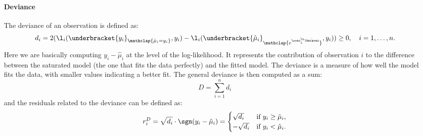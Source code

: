 \paragraph{Deviance}

The deviance of an observation is defined as:
\begin{equation}
    d_i = 2(\l_i(\underbracket{y_i}_{\mathclap{\hat{\mu}_i = y_i}}, y_i) - \l_i(\underbracket{\hat{\mu}_i}_{\mathclap{e^{\xvec_i^\t\hat{\betavec}}}}, y_i)) \geq 0, \quad i = 1, \ldots, n.
\end{equation}
Here we are basically computing $y_i - \hat{\mu}_i$ at the level of the log-likelihood. It represents the contribution of observation $i$ to the difference between the saturated model (the one that fits the data perfectly) and the fitted model. The deviance is a measure of how well the model fits the data, with smaller values indicating a better fit. The general deviance is then computed as a sum:
\begin{equation}
    D = \sum_{i = 1}^n d_i
\end{equation}
and the residuals related to the deviance can be defined as:
\begin{equation}
    r_i^D = \sqrt{d_i} \cdot \sgn(y_i - \hat{\mu}_i) = \begin{cases}
        \sqrt{d_i}  & \text{if } y_i \geq \hat{\mu}_i, \\
        -\sqrt{d_i} & \text{if } y_i < \hat{\mu}_i.    \\
    \end{cases}
\end{equation}
